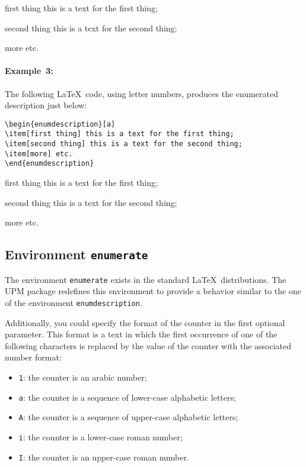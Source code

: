 \documentclass[book,taskpackage,specpackage,codepackage]{upmethodology-document}
\begin{document}
\begin{enumdescription}[1]
\item[first thing] this is a text for the first thing;
\item[second thing] this is a text for the second thing;
\item[more] etc.
\end{enumdescription}

\paragraph{Example~3:} The following \LaTeX~code, using letter numbers, produces the enumerated description just below:
\begin{verbatim}
\begin{enumdescription}[a]
\item[first thing] this is a text for the first thing;
\item[second thing] this is a text for the second thing;
\item[more] etc.
\end{enumdescription}
\end{verbatim}

\begin{enumdescription}[a]
\item[first thing] this is a text for the first thing;
\item[second thing] this is a text for the second thing;
\item[more] etc.
\end{enumdescription}

\subsection{Environment \texttt{enumerate}}

The environment \texttt{enumerate} exists in the standard \LaTeX\ distributions.
The UPM package redefines this environment to provide a behavior similar to the one of the environment \texttt{enumdescription}.

Additionally, you could specify the format of the counter in the first optional parameter. This format is a text in which the first occurrence of one of the following characters is replaced by the value of the counter with the associated number format:
\begin{itemize}
\item \texttt{1}: the counter is an arabic number;
\item \texttt{a}: the counter is a sequence of lower-case alphabetic letters;
\item \texttt{A}: the counter is a sequence of upper-case alphabetic letters;
\item \texttt{i}: the counter is a lower-case roman number;
\item \texttt{I}: the counter is an upper-case roman number.
\end{itemize}
\end{document}
